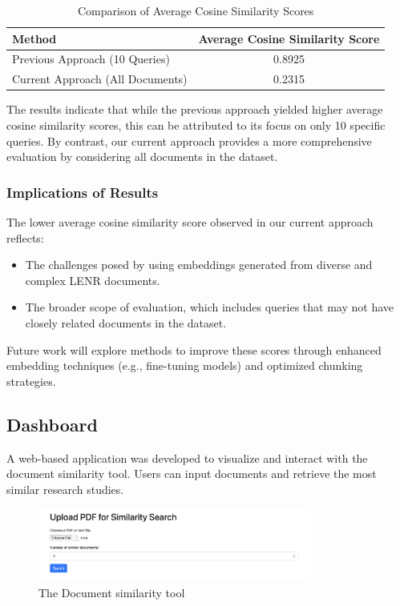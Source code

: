 \documentclass[12pt]{article}
\begin{document}
\begin{table}[h!]
    \centering
    \caption{Comparison of Average Cosine Similarity Scores}
    \label{tab:cosine-similarity-comparison}
    \begin{tabular}{|l|c|}
        \hline
        \textbf{Method} & \textbf{Average Cosine Similarity Score} \\ 
        \hline
        Previous Approach (10 Queries) & 0.8925 \\ 
        Current Approach (All Documents) & 0.2315 \\ 
        \hline
    \end{tabular}
\end{table}

The results indicate that while the previous approach yielded higher average cosine similarity scores, this can be attributed to its focus on only 10 specific queries. By contrast, our current approach provides a more comprehensive evaluation by considering all documents in the dataset.

\subsubsection{Implications of Results}

The lower average cosine similarity score observed in our current approach reflects:
\begin{itemize}
    \item The challenges posed by using embeddings generated from diverse and complex LENR documents.
    \item The broader scope of evaluation, which includes queries that may not have closely related documents in the dataset.
\end{itemize}

Future work will explore methods to improve these scores through enhanced embedding techniques (e.g., fine-tuning models) and optimized chunking strategies.

    \subsection{Dashboard}
    A web-based application was developed to visualize and interact with the document similarity tool. 
    Users can input documents and retrieve the most similar research studies.
    \begin{figure}[h!]
        \centering
        \includegraphics[width=0.8\textwidth]{images/query.png}
        \caption{The Document similarity tool}
        \label{fig:Screenshot of the document similarity tool}
    \end{figure}
\end{document}
